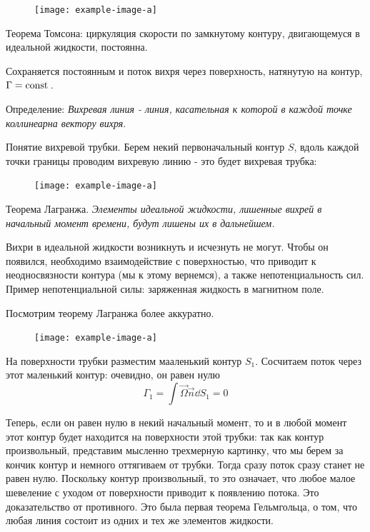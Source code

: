 \begin{figure}[h!]
    \centering
    \texttt{[image: example-image-a]}
    \caption{}
    \label{fig:figure1}
\end{figure}

Теорема Томсона: циркуляция скорости по замкнутому контуру, двигающемуся в идеальной жидкости, постоянна.

Сохраняется постоянным и поток вихря через поверхность, натянутую на контур, $\Gamma=\mathrm{const}\,$.

Определение: \textit{Вихревая линия - линия, касательная к которой в каждой точке коллинеарна вектору вихря}.

Понятие вихревой трубки. Берем некий первоначальный контур $S$, вдоль каждой точки границы проводим вихревую линию - это будет вихревая трубка:
\begin{figure}[h!]
    \centering
    \texttt{[image: example-image-a]}
    \caption{}
    \label{fig:figure1}
\end{figure}

Теорема Лагранжа. \textit{Элементы идеальной жидкости, лишенные вихрей в начальный момент времени, будут лишены их в дальнейшем.}

Вихри в идеальной жидкости возникнуть и исчезнуть не могут. Чтобы он появился, необходимо взаимодействие с поверхностью, что приводит к неодносвязности контура (мы к этому вернемся), а также непотенциальность сил. Пример непотенциальной силы: заряженная жидкость в магнитном поле.

Посмотрим теорему Лагранжа более аккуратно. 

\begin{figure}[h!]
    \centering
    \texttt{[image: example-image-a]}
    \caption{}
    \label{fig:figure1}
\end{figure}

На поверхности трубки разместим мааленький контур $S_1$. Сосчитаем поток через этот маленький контур: очевидно, он равен нулю 
\begin{equation}
	\Gamma_1=\int \vec\Omega \vec{n}\dd S_1 = 0
\end{equation}

Теперь, если он равен нулю в некий начальный момент, то и в любой момент этот контур будет находится на поверхности этой трубки: так как контур произвольный, представим мысленно трехмерную картинку, что мы берем за кончик контур и немного оттягиваем от трубки. Тогда сразу поток сразу станет не равен нулю. Поскольку контур произвольный, то это означает, что любое малое шевеление с уходом от поверхности приводит к появлению потока. Это доказательство от противного. Это была первая теорема Гельмгольца, о том, что любая линия состоит из одних и тех же элементов жидкости.

